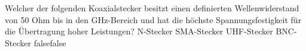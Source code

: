     {Welcher der folgenden Koaxialstecker besitzt einen definierten Wellenwiderstand von 50 Ohm bis in den GHz-Bereich und hat die höchste Spannungsfestigkeit für die Übertragung hoher Leistungen?}
    {N-Stecker}
    {SMA-Stecker}
    {UHF-Stecker}
    {BNC-Stecker}
    {false}{false}